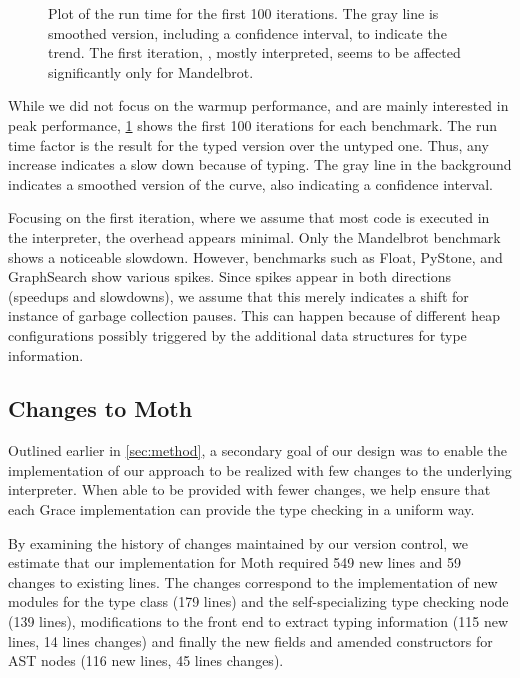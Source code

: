 \begin{figure}
	\TypingWarmup{}
	\caption{Plot of the run time for the first 100 iterations.
           The gray line is smoothed version, including a confidence interval,
           to indicate the trend.
           The first iteration, \ie, mostly interpreted, seems
           to be affected significantly only for Mandelbrot.}
	\label{fig:typing-warmup}
\end{figure}

While we did not focus on the warmup performance,
and are mainly interested in peak performance,
\cref{fig:typing-warmup} shows the first 100 iterations for each benchmark.
The run time factor is the result for the typed version over the untyped one.
Thus, any increase indicates a slow down because of typing.
The gray line in the background indicates a smoothed version of the curve,
also indicating a confidence interval.

Focusing on the first iteration,
where we assume that most code is executed in the interpreter,
the overhead appears minimal.
Only the Mandelbrot benchmark shows a noticeable slowdown.
However, benchmarks such as Float, PyStone, and GraphSearch show various spikes.
Since spikes appear in both directions (speedups and slowdowns),
we assume that this merely indicates a shift
for instance of garbage collection pauses.
This can happen because of different heap configurations
possibly triggered by the additional data structures for type information.



%
%

\subsection{Changes to Moth}

Outlined earlier in \cref{sec:method}, a secondary
goal of our design was to enable the implementation of our approach to be
realized with few changes to the underlying interpreter.
When able to be provided with fewer changes, 
we help ensure that each Grace implementation
can provide the type checking in a uniform way.

By examining the history of changes maintained by our version control, 
we estimate that our implementation for Moth required
549 new lines and 59 changes to existing lines. 
The changes correspond to the implementation of 
new modules for the type class (179 lines) and 
the self-specializing type checking node (139 lines),
modifications to the front end to extract typing information
(115 new lines, 14 lines changes)
and finally the new fields and amended constructors for AST nodes 
(116 new lines, 45 lines changes).

